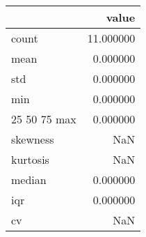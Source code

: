 \begin{tabular}{lr}
\toprule
 & value \\
\midrule
count & 11.000000 \\
mean & 0.000000 \\
std & 0.000000 \\
min & 0.000000 \\
25%
50%
75%
max & 0.000000 \\
skewness & NaN \\
kurtosis & NaN \\
median & 0.000000 \\
iqr & 0.000000 \\
cv & NaN \\
\bottomrule
\end{tabular}
